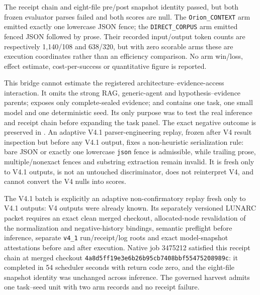 The receipt chain and eight-file pre/post snapshot identity passed, but both
frozen evaluator parses failed and both scores are null.  The
\texttt{Orion\_CONTEXT} arm emitted exactly one lowercase JSON fence; the
\texttt{DIRECT\_CORPUS} arm emitted fenced JSON followed by prose.  Their
recorded input/output token counts are respectively 1,140/108 and 638/320, but
with zero scorable arms these are execution coordinates rather than an
efficiency comparison.  No arm win/loss, effect estimate, cost-per-success or
quantitative figure is reported.

This bridge cannot estimate the registered architecture--evidence-access
interaction.  It omits the strong RAG, generic-agent and hypothesis--evidence
parents; exposes only complete-sealed evidence; and contains one task, one small
model and one deterministic seed.  Its only purpose was to test the real
inference and receipt chain before expanding the task panel.  The exact negative
outcome is preserved in
.
An adaptive V4.1 parser-engineering replay, frozen after V4 result inspection
but before any V4.1 output, fixes a non-heuristic serialization rule:
bare JSON or exactly one lowercase \texttt{json} fence is admissible, while
trailing prose, multiple/nonexact fences and substring extraction remain invalid.
It is fresh only to V4.1 outputs, is not an untouched discriminator, does not
reinterpret V4, and cannot convert the V4 nulls into scores.

The V4.1 batch is explicitly an adaptive non-confirmatory replay fresh only to
V4.1 outputs: V4 outputs were already known.  Its separately versioned LUNARC
packet requires an exact clean merged checkout, allocated-node revalidation of
the normalization and negative-history bindings, semantic preflight before
inference, separate \texttt{v4\_1} run/receipt/log roots and exact model-snapshot
attestations before and after execution.  Native job 3475212 satisfied this
receipt chain at merged checkout
\texttt{4a8d5ff19e3e6b26b95cb7408bbf55475208989c}: it completed in 54
scheduler seconds with return code zero, and the eight-file snapshot identity
was unchanged across inference.  The governed harvest admits one task--seed
unit with two arm records and no receipt failure.

